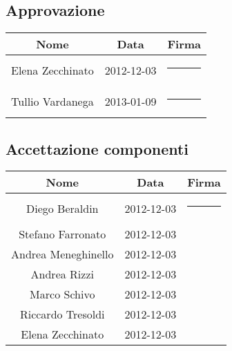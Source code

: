 \subsection{Approvazione}
\begin{center}
\begin{tabularx}{0.8\textwidth}{c|c|c}
{\bf Nome}&{\bf Data}&{\bf Firma}\\ 
\hline
\multirow{2}{*}{Elena Zecchinato} & \multirow{2}{*}{2012-12-03} &\rule{3cm}{0cm} \\&&\\
\multirow{2}{*}{Tullio Vardanega} & \multirow{2}{*}{2013-01-09} &\rule{3cm}{0cm} \\&&\\
\end{tabularx}
\end{center}

\subsection{Accettazione componenti}
\begin{center}
\begin{tabularx}{0.9\textwidth}{c|c|c}
{\bf Nome}&{\bf Data}&{\bf Firma }\\ 
\hline
\multirow{2}{*}{Diego Beraldin} & \multirow{2}{*}{2012-12-03}&\rule{3cm}{0cm}\\&&\\
\multirow{2}{*}{Stefano Farronato} &\multirow{2}{*}{2012-12-03}&\\&&\\
\multirow{2}{*}{Andrea Meneghinello} &\multirow{2}{*}{2012-12-03}&\\&&\\
\multirow{2}{*}{Andrea Rizzi} &\multirow{2}{*}{2012-12-03}&\\&&\\
\multirow{2}{*}{Marco Schivo} &\multirow{2}{*}{2012-12-03}&\\&&\\
\multirow{2}{*}{Riccardo Tresoldi} &\multirow{2}{*}{2012-12-03}&\\&&\\
\multirow{2}{*}{Elena Zecchinato}&\multirow{2}{*}{2012-12-03}&\\&&\\
\end{tabularx}
\end{center}

